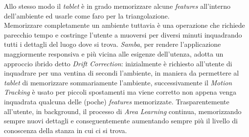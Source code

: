 Allo stesso modo il \emph{tablet} è in grado memorizzare alcune \emph{features} all'interno dell'ambiente ed usarle come faro per la triangolazione. \\
Memorizzare completamente un ambiente tuttavia è una operazione che richiede parecchio tempo e costringe l'utente a muoversi per diversi minuti inquadrando tutti i dettagli del luogo dove si trova. \emph{Samba}, per rendere l'applicazione maggiormente responsiva e più vicina alle esigenze dell'utenza, adotta un approccio ibrido detto \emph{Drift Correction}: inizialmente è richiesto all'utente di inquadrare per una ventina di secondi l'ambiente, in maniera da permettere al \emph{tablet} di memorizzare sommariamente l'ambiente, successivamente il \emph{Motion Tracking} è usato per piccoli spostamenti ma viene corretto non appena venga inquadrata qualcuna delle (poche) \emph{features} memorizzate. Trasparentemente all'utente, in background, il processo di \emph{Area Learning} continua, memorizzando sempre nuovi dettagli e conseguentemente aumentando sempre più il livello di conoscenza della stanza in cui ci si trova.\\

